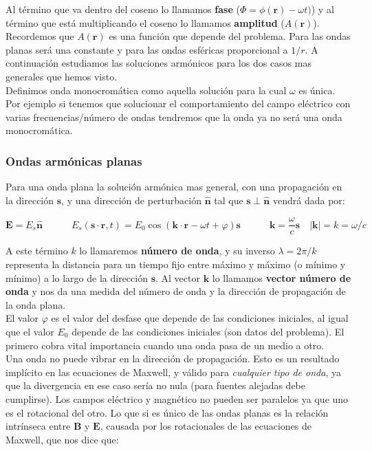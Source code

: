 \documentclass[12pt]{article}
\newcommand{\tquad}{\quad \quad \quad}
\newcommand{\Bn}{\mathbf{B}}
\newcommand{\En}{\mathbf{E}}
\newcommand{\kn}{\mathbf{k}}
\newcommand{\rn}{\mathbf{r}}
\newcommand{\sn}{\mathbf{s}}
\newcommand{\hnn}{\hat{\mathbf{n}}}
\numberwithin{equation}{section}
\numberwithin{figure}{section}
\begin{document}
Al término que va dentro del coseno lo llamamos \textbf{fase} ($\Phi = \phi(\rn) - \omega t)$) y al término que está multiplicando el coseno lo llamamos \textbf{amplitud} ($A(\rn)$). \\

Recordemos que $A(\rn)$ es una función que depende del problema. Para las ondas planas será una constante y para las ondas esféricas proporcional a $1/r$. A continuación estudiamos las soluciones armónicos para los dos casos mas generales que hemos visto.  \\

Definimos onda monocromática como aquella solución para la cual $\omega$ es única. Por ejemplo si tenemos que solucionar el comportamiento del campo eléctrico con varias frecuencias/número de ondas tendremos que la onda ya no será una onda monocromática.

\subsubsection{Ondas armónicas planas}

Para una onda plana la solución armónica mas general, con una propagación en la dirección $\sn$, y una dirección de perturbación $\hnn$ tal que $\sn \perp \hnn$ vendrá dada por:

\begin{equation}
\En = E_s \hnn \tquad E_s(\sn\cdot\rn,t) = E_0 \cos ( \kn \cdot \rn - \omega t + \varphi) \sn  \tquad \kn = \frac{\omega}{c} \sn \quad |\kn| = k = \omega / c
\end{equation}

A este término $k$ lo llamaremos \textbf{número de onda}, y su inverso $\lambda = 2 \pi / k$ representa la distancia para un tiempo fijo entre máximo y máximo (o mínimo y mínimo) a lo largo de la dirección $\sn$. Al vector $\kn$ lo llamamos \textbf{vector número de onda} y nos da una medida del número de onda y la dirección de propagación de la onda plana.  \\


 El valor $\varphi$ es el valor del desfase que depende de las condiciones iniciales, al igual que el valor $E_0$ depende de las condiciones iniciales (son datos del problema). El primero cobra vital importancia cuando una onda pasa de un medio a otro.  \\
 
 
Una onda no puede vibrar en la dirección de propagación. Esto es un resultado implícito en las ecuaciones de Maxwell, y válido para \textit{cualquier tipo de onda}, ya que la divergencia en ese caso sería no nula (para fuentes alejadas debe cumplirse). Los campos eléctrico y magnético no pueden ser paralelos ya que uno es el rotacional del otro. Lo que si es único de las ondas planas es la relación intrínseca entre $\Bn$ y $\En$, causada por los rotacionales de las ecuaciones de Maxwell, que nos dice que:
\end{document}
